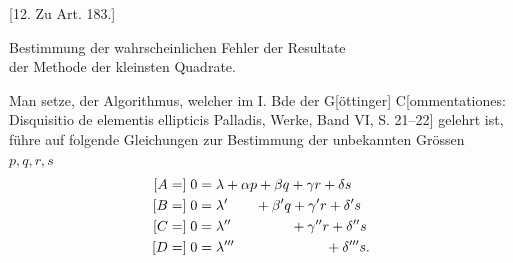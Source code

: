 \begin{center}
[12. Zu Art. 183.]
\end{center}
\begin{center}
Bestimmung der wahrscheinlichen Fehler der Resultate\\
der Methode der kleinsten Quadrate.
\end{center}
Man setze, der Algorithmus, welcher im I. Bde der G[öttinger] C[ommenta\-tiones: Disquisitio de elementis ellipticis Palladis, Werke, Band VI, S. 21--22] ge\-lehrt ist, führe auf folgende Gleichungen zur Bestimmung der unbekannten Grössen \(p,q,r,s\)
\[
\begin{aligned}
\relax[A=]\;0&=\lambda+\alpha p+\beta q+\gamma r+\delta s\\
[B=]\;0&=\lambda'\phantom{+\alpha p}+\beta'q+\gamma'r+\delta's\\
[C=]\;0&=\lambda''\phantom{+\alpha p+\beta q}+\gamma''r+\delta''s\\
[D=]\;0&=\lambda'''\phantom{+\alpha p+\beta q+\gamma r}+\delta'''s.
\end{aligned}
\]

